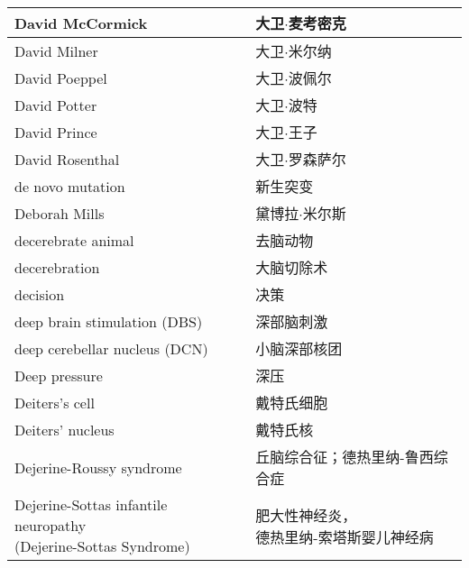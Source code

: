 \begin{longtable}{lll}
	\midrule
	David McCormick     &&  大卫$\cdot$麦考密克  \\
	
	\midrule
	David Milner     &&  大卫$\cdot$米尔纳  \\
	
	\midrule
	David Poeppel     &&  大卫$\cdot$波佩尔  \\
	
	\midrule
	David Potter     &&  大卫$\cdot$波特  \\
	
	\midrule
	David Prince     &&  大卫$\cdot$王子  \\
	
	\midrule
	David Rosenthal     &&  大卫$\cdot$罗森萨尔  \\
	
	\midrule
	de novo mutation     &&  新生突变  \\
	
	\midrule
	Deborah Mills     &&  黛博拉$\cdot$米尔斯  \\
	
	\midrule
	decerebrate animal     &&  去脑动物  \\
	
	\midrule
	decerebration     &&  大脑切除术  \\
	
	\midrule
	decision     &&  决策  \\
	
	\midrule
	deep brain stimulation (DBS)     &&  深部脑刺激  \\
	
	\midrule
	deep cerebellar nucleus (DCN)  &&  小脑深部核团  \\
	
	\midrule
	Deep pressure   &&  深压  \\
	
	\midrule
	Deiters's cell   &&  戴特氏细胞  \\
	
	\midrule
	Deiters' nucleus   &&  戴特氏核  \\
	
	\midrule
	Dejerine-Roussy syndrome   &&  丘脑综合征；德热里纳-鲁西综合症  \\
	
	\midrule
	\makecell[l]{Dejerine-Sottas infantile neuropathy \\ (Dejerine-Sottas Syndrome)}  &&  \makecell[l]{肥大性神经炎，\\德热里纳-索塔斯婴儿神经病}  \\
	

\end{longtable}
